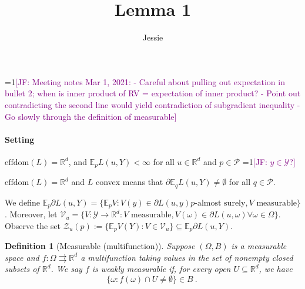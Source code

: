 \documentclass{article}
\title{Lemma 1}
\author{Jessie}
\newcommand{\Comments}{1}
\newcommand{\mynote}[2]{\ifnum\Comments=1\textcolor{#1}{#2}\fi}
\newcommand{\jessie}[1]{\mynote{purple}{[JF: #1]}}
\newcommand{\reals}{\mathbb{R}}
\newcommand{\effdom}{\mathrm{effdom}}
\newcommand{\B}{\mathcal{B}}
\newcommand{\E}{\mathbb{E}}
\renewcommand{\P}{\mathcal{P}}
\newcommand{\V}{\mathcal{V}}
\newcommand{\Y}{\mathcal{Y}}
\newcommand{\Z}{\mathcal{Z}}
\newcommand{\toto}{\rightrightarrows}
\newtheorem{definition}{Definition}
\begin{document}
\maketitle
	\jessie{Meeting notes Mar 1, 2021: - Careful about pulling out expectation in bullet 2; when is inner product of RV = expectation of inner product? - Point out contradicting the second line would yield contradiction of subgradient inequality - Go slowly through the definition of measurable}
\paragraph{Setting} 
$\effdom(L) = \reals^d$, and $\E_p L(u,Y) < \infty$ for all $u \in \reals^d$ and $p \in \P$ \jessie{$y \in \Y$?}

$\effdom(L) = \reals^d$ and $L$ convex means that $\partial \E_q L(u,Y) \neq \emptyset$ for all $q \in \P$.

We define $\E_p \partial L(u,Y) = \{\E_p V: V(y) \in \partial L(u,y) p\text{-almost surely}, V \text{ measurable}\}$.
Moreover, let $\V_{u} = \{V : \Y \to \reals^d : V \text{ measurable}, V(\omega) \in \partial L(u,\omega) \forall \omega \in \Omega\}$.
Observe the set $\Z_u(p) := \{\E_p V(Y): V \in \V_u\} \subseteq \E_p \partial L(u,Y)$.

\begin{definition}[Measurable (multifunction)]
	Suppose $(\Omega, B)$ is a measurable space and $f:\Omega \toto \reals^d$ a multifunction taking values in the set of nonempty closed subsets of $\reals^d$.
	We say $f$ is weakly measurable if, for every open $U \subseteq \reals^d$, we have
	\begin{equation*}
	\{\omega : f(\omega) \cap U \neq \emptyset\} \in B~.~
	\end{equation*}
\end{definition}
\end{document}
